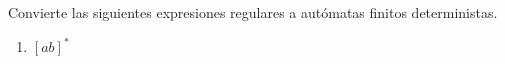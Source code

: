 \begin{Pro}
Convierte las siguientes expresiones regulares a autómatas finitos deterministas. 
\begin{enumerate}
    \item $[ab]^*$ 
\end{enumerate}
\end{Pro}